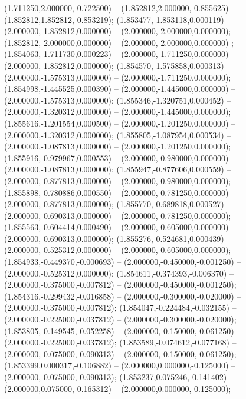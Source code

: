  (1.711250,2.000000,-0.722500) -- (1.852812,2.000000,-0.855625) -- (1.852812,1.852812,-0.853219);
 (1.853477,-1.853118,0.000119) -- (2.000000,-1.852812,0.000000) -- (2.000000,-2.000000,0.000000);
 (1.852812,-2.000000,0.000000) -- (2.000000,-2.000000,0.000000) ;
 (1.854063,-1.711730,0.000223) -- (2.000000,-1.711250,0.000000) -- (2.000000,-1.852812,0.000000);
 (1.854570,-1.575858,0.000313) -- (2.000000,-1.575313,0.000000) -- (2.000000,-1.711250,0.000000);
 (1.854998,-1.445525,0.000390) -- (2.000000,-1.445000,0.000000) -- (2.000000,-1.575313,0.000000);
 (1.855346,-1.320751,0.000452) -- (2.000000,-1.320312,0.000000) -- (2.000000,-1.445000,0.000000);
 (1.855616,-1.201554,0.000500) -- (2.000000,-1.201250,0.000000) -- (2.000000,-1.320312,0.000000);
 (1.855805,-1.087954,0.000534) -- (2.000000,-1.087813,0.000000) -- (2.000000,-1.201250,0.000000);
 (1.855916,-0.979967,0.000553) -- (2.000000,-0.980000,0.000000) -- (2.000000,-1.087813,0.000000);
 (1.855947,-0.877606,0.000559) -- (2.000000,-0.877813,0.000000) -- (2.000000,-0.980000,0.000000);
 (1.855898,-0.780886,0.000550) -- (2.000000,-0.781250,0.000000) -- (2.000000,-0.877813,0.000000);
 (1.855770,-0.689818,0.000527) -- (2.000000,-0.690313,0.000000) -- (2.000000,-0.781250,0.000000);
 (1.855563,-0.604414,0.000490) -- (2.000000,-0.605000,0.000000) -- (2.000000,-0.690313,0.000000);
 (1.855276,-0.524681,0.000439) -- (2.000000,-0.525312,0.000000) -- (2.000000,-0.605000,0.000000);
 (1.854933,-0.449370,-0.000693) -- (2.000000,-0.450000,-0.001250) -- (2.000000,-0.525312,0.000000);
 (1.854611,-0.374393,-0.006370) -- (2.000000,-0.375000,-0.007812) -- (2.000000,-0.450000,-0.001250);
 (1.854316,-0.299432,-0.016858) -- (2.000000,-0.300000,-0.020000) -- (2.000000,-0.375000,-0.007812);
 (1.854047,-0.224484,-0.032155) -- (2.000000,-0.225000,-0.037812) -- (2.000000,-0.300000,-0.020000);
 (1.853805,-0.149545,-0.052258) -- (2.000000,-0.150000,-0.061250) -- (2.000000,-0.225000,-0.037812);
 (1.853589,-0.074612,-0.077168) -- (2.000000,-0.075000,-0.090313) -- (2.000000,-0.150000,-0.061250);
 (1.853399,0.000317,-0.106882) -- (2.000000,0.000000,-0.125000) -- (2.000000,-0.075000,-0.090313);
 (1.853237,0.075246,-0.141402) -- (2.000000,0.075000,-0.165312) -- (2.000000,0.000000,-0.125000);

